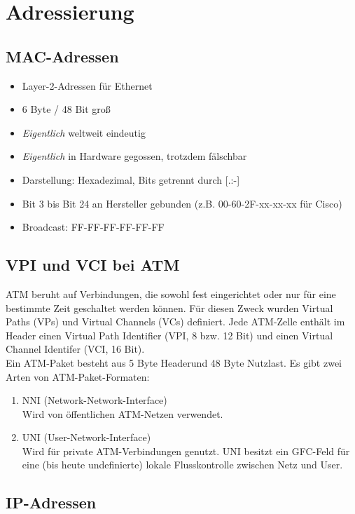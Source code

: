 \documentclass{article} %
\begin{document}
\section{Adressierung}
\subsection{MAC-Adressen}

\begin{itemize}
	\item Layer-2-Adressen für Ethernet
	\item 6 Byte / 48 Bit groß
	\item \emph{Eigentlich} weltweit eindeutig
	\item \emph{Eigentlich} in Hardware gegossen, trotzdem fälschbar
	\item Darstellung: Hexadezimal, Bits getrennt durch [.:-]
	\item Bit 3 bis Bit 24 an Hersteller gebunden (z.B. 00-60-2F-xx-xx-xx für Cisco)
	\item Broadcast: FF-FF-FF-FF-FF-FF 
\end{itemize}

\subsection{VPI und VCI bei ATM}
ATM beruht auf Verbindungen, die sowohl fest eingerichtet oder nur für eine bestimmte Zeit geschaltet werden können. Für diesen Zweck wurden Virtual Paths (VPs) und Virtual Channels (VCs) definiert. Jede ATM-Zelle enthält im Header einen Virtual Path Identifier (VPI, 8 bzw. 12 Bit) und einen Virtual Channel Identifer (VCI, 16 Bit).\\
Ein ATM-Paket besteht aus 5 Byte Headerund 48 Byte Nutzlast. Es gibt zwei Arten von ATM-Paket-Formaten:
	\begin{enumerate}
		\item NNI (Network-Network-Interface)\\
		Wird von öffentlichen ATM-Netzen verwendet.	
		\item UNI (User-Network-Interface)\\
		Wird für private ATM-Verbindungen genutzt. UNI besitzt ein GFC-Feld für eine (bis heute undefinierte) lokale Flusskontrolle zwischen Netz und User.
	\end{enumerate}
\subsection{IP-Adressen}
\end{document}
